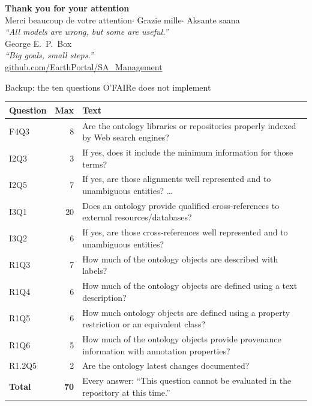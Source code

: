 \documentclass[aspectratio=169,10pt]{beamer}
\begin{document}
{
\begin{frame}[plain]
  \centering
  \vspace{0.6cm}
  {\Large\bfseries Thank you for your attention}\\[8pt]
  {\large Merci beaucoup de votre attention}\quad\textcolor{dtband}{$\cdot$}\quad
  {\large Grazie mille}\quad\textcolor{dtband}{$\cdot$}\quad
  {\large Aksante saana}\\[1.1cm]
  {\itshape ``All models are wrong, but some are useful.''}\\[2pt]
  {\small George E.\ P.\ Box}\\[0.6cm]
  {\itshape ``Big goals, small steps.''}\\[1.0cm]
  {\small\href{https://github.com/EarthPortal/SA_Management}{github.com/EarthPortal/SA\_Management}}
\end{frame}
}

\appendix

\begin{frame}{Backup: the ten questions O'FAIRe does not implement}
  \scriptsize
  \begin{tabularx}{\textwidth}{@{}l r X@{}}
    \toprule
    Question & Max & Text\\
    \midrule
    F4Q3 & 8 & Are the ontology libraries or repositories properly indexed by Web search engines?\\
    I2Q3 & 3 & If yes, does it include the minimum information for those terms?\\
    I2Q5 & 7 & If yes, are those alignments well represented and to unambiguous entities? \dots\\
    I3Q1 & 20 & Does an ontology provide qualified cross-references to external resources/databases?\\
    I3Q2 & 6 & If yes, are those cross-references well represented and to unambiguous entities?\\
    R1Q3 & 7 & How much of the ontology objects are described with labels?\\
    R1Q4 & 6 & How much of the ontology objects are defined using a text description?\\
    R1Q5 & 6 & How much ontology objects are defined using a property restriction or an equivalent class?\\
    R1Q6 & 5 & How much of the ontology objects provide provenance information with annotation properties?\\
    R1.2Q5 & 2 & Are the ontology latest changes documented?\\
    \midrule
    \textbf{Total} & \textbf{70} & Every answer: ``This question cannot be evaluated in the repository at this time.''\\
    \bottomrule
  \end{tabularx}
\end{frame}
\end{document}
